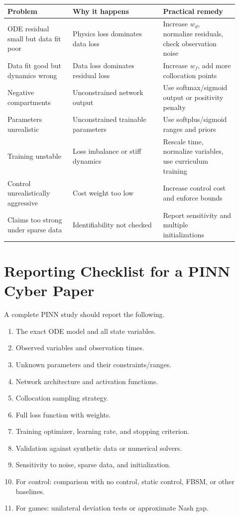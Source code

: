 \documentclass[11pt,a4paper]{article}
\begin{document}
\begin{longtable}{p{0.26\linewidth}p{0.36\linewidth}p{0.30\linewidth}}
\toprule
Problem & Why it happens & Practical remedy \\
\midrule
ODE residual small but data fit poor & Physics loss dominates data loss & Increase $w_d$, normalize residuals, check observation noise \\
Data fit good but dynamics wrong & Data loss dominates residual loss & Increase $w_f$, add more collocation points \\
Negative compartments & Unconstrained network output & Use softmax/sigmoid output or positivity penalty \\
Parameters unrealistic & Unconstrained trainable parameters & Use softplus/sigmoid ranges and priors \\
Training unstable & Loss imbalance or stiff dynamics & Rescale time, normalize variables, use curriculum training \\
Control unrealistically aggressive & Cost weight too low & Increase control cost and enforce bounds \\
Claims too strong under sparse data & Identifiability not checked & Report sensitivity and multiple initializations \\
\bottomrule
\end{longtable}

\section{Reporting Checklist for a PINN Cyber Paper}
A complete PINN study should report the following.
\begin{enumerate}[leftmargin=2em]
    \item The exact ODE model and all state variables.
    \item Observed variables and observation times.
    \item Unknown parameters and their constraints/ranges.
    \item Network architecture and activation functions.
    \item Collocation sampling strategy.
    \item Full loss function with weights.
    \item Training optimizer, learning rate, and stopping criterion.
    \item Validation against synthetic data or numerical solvers.
    \item Sensitivity to noise, sparse data, and initialization.
    \item For control: comparison with no control, static control, FBSM, or other baselines.
    \item For games: unilateral deviation tests or approximate Nash gap.
\end{enumerate}
\end{document}

